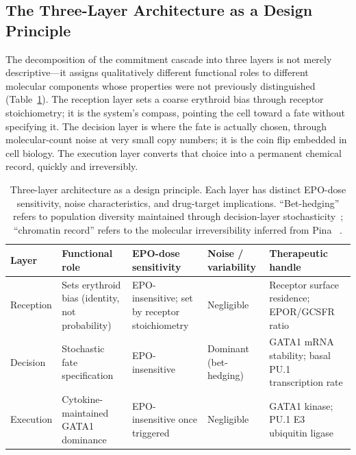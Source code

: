 \subsection{The Three-Layer Architecture as a Design Principle}

The decomposition of the commitment cascade into three layers is not merely descriptive---it assigns qualitatively different functional roles to different molecular components whose properties were not previously distinguished (Table~\ref{tab:layers_disc}). The reception layer sets a coarse erythroid bias through receptor stoichiometry; it is the system's compass, pointing the cell toward a fate without specifying it. The decision layer is where the fate is actually chosen, through molecular-count noise at very small copy numbers; it is the coin flip embedded in cell biology. The execution layer converts that choice into a permanent chemical record, quickly and irreversibly.

\begin{table}[ht]
\caption{Three-layer architecture as a design principle. Each layer has distinct EPO-dose sensitivity, noise characteristics, and drug-target implications. ``Bet-hedging'' refers to population diversity maintained through decision-layer stochasticity~\cite{losick2008}; ``chromatin record'' refers to the molecular irreversibility inferred from Pina \etal~\cite{pina2012}.}
\label{tab:layers_disc}
\centering
\small
\begin{tabularx}{\linewidth}{@{}lXlXX@{}}
\toprule
\textbf{Layer} & \textbf{Functional role} & \textbf{EPO-dose sensitivity} & \textbf{Noise / variability} & \textbf{Therapeutic handle} \\
\midrule
Reception & Sets erythroid bias (identity, not probability) & EPO-insensitive; set by receptor stoichiometry & Negligible & Receptor surface residence; EPOR/GCSFR ratio \\
\addlinespace
Decision & Stochastic fate specification & EPO-insensitive & Dominant (bet-hedging) & GATA1 mRNA stability; basal PU.1 transcription rate \\
\addlinespace
Execution & Cytokine-maintained GATA1 dominance & EPO-insensitive once triggered & Negligible & GATA1 kinase; PU.1 E3 ubiquitin ligase \\
\bottomrule
\end{tabularx}
\end{table}

